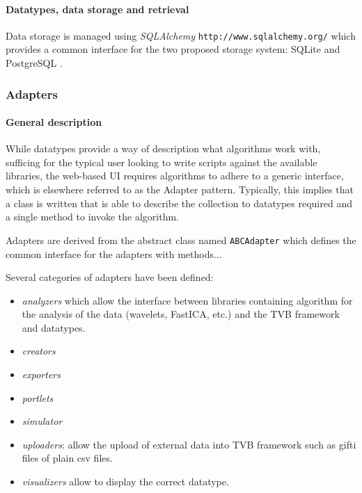 
\paragraph{Datatypes, data storage and retrieval} 

Data storage is managed using \emph{SQLAlchemy}
\texttt{http://www.sqlalchemy.org/} which provides a common interface for the
two proposed storage system: SQLite and PostgreSQL .

\subsubsection{Adapters}

\paragraph{General description}

While datatypes provide a way of description what algorithms work with, 
sufficing for the typical user looking to write scripts against the
available libraries, the web-based UI requires algorithms to adhere to 
a generic interface, which is elsewhere referred to as the Adapter pattern.
Typically, this implies that a class is written that is able to describe
the collection to datatypes required and a single method to invoke the
algorithm.

Adapters are derived from the abstract class named \texttt{ABCAdapter} which
defines the common interface for the adapters with methods...

Several categories of adapters have been defined: 
\begin{itemize}
    \item \textit{analyzers} which allow the interface between libraries
        containing algorithm for the analysis of the data (wavelets, FastICA,
        etc.) and the TVB framework and datatypes.
    \item \textit{creators}
    \item \textit{exporters} 
    \item \textit{portlets} 
    \item \textit{simulator}
\item \textit{uploaders}: allow the upload of external data into TVB framework
    such as gifti files of plain csv files.
\item \textit{visualizers}  allow
    to display the correct datatype.
\end{itemize}


